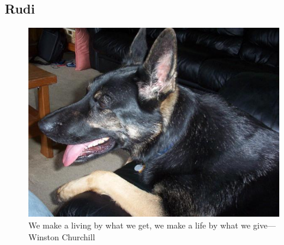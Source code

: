 \subsection {Rudi}
\begin{figure}[h]
	\includegraphics[width=\textwidth]{000_0186}
	\caption [Rudi Smiling] {We make a living by what we get, we make a life by what we give---Winston Churchill}
\end{figure}

